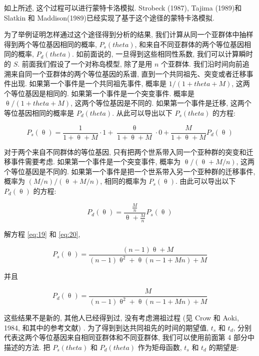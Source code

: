 \documentclass[12pt]{article}
\begin{document}
如上所述, 这个过程可以进行蒙特卡洛模拟. Strobeck (1987), Tajima (1989)和 Slatkin 和
Maddison(1989)已经实现了基于这个途径的蒙特卡洛模拟.

为了举例证明怎样通过这个途径得到分析的结果, 我们计算从同一个亚群体中抽样得到两个等位基因相同的概率, $P_{s}(theta )$,
和来自不同亚群体的两个等位基因相同的概率, $P_{d}(theta )$.
如前面说的, 一旦得到这些相同性系数, 我们可以计算瞬时的 $S$.
前面我们假设了一个对称岛模型, 除了是用 $n$ 个亚群体.
我们沿时间向前追溯来自同一个亚群体的两个等位基因的系谱, 直到一个共同祖先、突变或者迁移事件出现.
如果第一个事件是一个共同祖先事件, 概率是 $1/(1+theta +M)$, 这两个等位基因是相同的.
如果第一个事件是一个突变事件. 概率是 $\uptheta /(1+theta +M)$, 这两个等位基因是不同的.
如果第一个事件是迁移, 这两个等位基因相同的概率是 $P_{d}(theta )$.
从此可以导出以下 $P_{s}(theta )$ 的方程:

\begin{equation} \label{eq:19}
    P_{s}(\uptheta)=\frac{1}{1+\uptheta +M}\cdot 1+\frac{\uptheta}{1+\uptheta +M}\cdot 0+\frac{M}{1+\uptheta +M}P_{d}(\uptheta)
\end{equation}

对于两个来自不同群体的等位基因, 只有把两个世系带入同一个亚种群的突变和迁移事件需要考虑.
如果第一个事件是一个突变事件, 概率为 $\uptheta /(\uptheta +M/n)$, 这两个等位基因是不同的.
如果第一个事件是把一个世系带入另一个亚种群的迁移事件, 概率为 $(M/n)/(\uptheta +M/n)$,
相同的概率为 $P_{s}(\uptheta)$.
由此可以导出以下 $P_{d}(\uptheta)$ 的方程:

\begin{equation} \label{eq:20}
    P_{d}(\uptheta)=\frac{\frac{M}{n}}{\uptheta +\frac{M}{n}}P_{s}(\uptheta)
\end{equation}

解方程 \ref{eq:19} 和 \ref{eq:20},

\begin{equation} \label{eq:21}
    P_{s}(\uptheta)=\frac{(n-1)\uptheta +M}{(n-1)\uptheta ^{2}+\uptheta (n-1+Mn)+M}
\end{equation}

并且

\begin{equation} \label{eq:22}
    P_{d}(\uptheta)=\frac{M}{(n-1)\uptheta ^{2}+\uptheta (n-1+Mn)+M}
\end{equation}

这些结果不是新的, 其他人已经得到过, 没有考虑溯祖过程 (见 Crow 和 Aoki, 1984, 和其中的参考文献) .
为了得到到达共同祖先的时间的期望值, $t_{s}$ 和 $t_{d}$, 分别代表这两个等位基因来自相同亚群体和不同亚群体,
我们可以使用前面第 4 部分中描述的方法.
把 $P_{s}(theta )$ 和 $P_{d}(theta )$ 作为矩母函数, $t_{s}$ 和 $t_{d}$ 的期望是:
\end{document}

